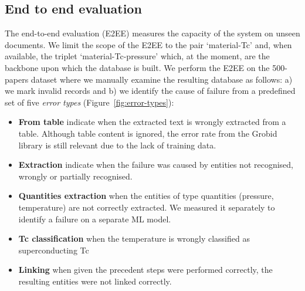 \documentclass{article}
\begin{document}


\subsection{End to end evaluation}

The end-to-end evaluation (E2EE) measures the capacity of the system on unseen documents.
We limit the scope of the E2EE to the pair `material-Tc' and, when available, the triplet `material-Tc-pressure' which, at the moment, are the backbone upon which the database is built.
We perform the E2EE on the 500-papers dataset where we manually examine the resulting database as follows: a) we mark invalid records and b) we identify the cause of failure from a predefined set of five \textit{error types} (Figure~\ref{fig:error-types}):  
\begin{itemize}
    \item \textbf{From table} indicate when the extracted text is wrongly extracted from a table. Although table content is ignored, the error rate from the Grobid library is still relevant due to the lack of training data. 
    \item \textbf{Extraction} indicate when the failure was caused by entities not recognised, wrongly or partially recognised.
    \item \textbf{Quantities extraction} when the entities of type quantities (pressure, temperature) are not correctly extracted. We measured it separately to identify a failure on a separate ML model.  
    \item \textbf{Tc classification} when the temperature is wrongly classified as superconducting Tc
    \item \textbf{Linking} when given the precedent steps were performed correctly, the resulting entities were not linked correctly. 
\end{itemize}
\end{document}

